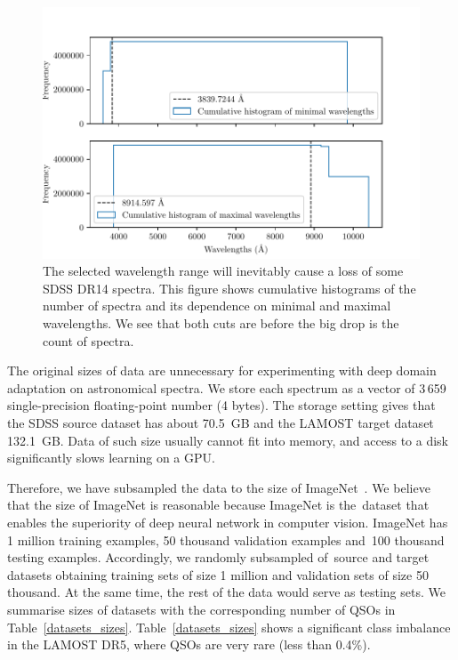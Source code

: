 \begin{figure}
\includegraphics[width=\textwidth]{img/waves_cumulative_hist.pdf}
\caption[Losts in SDSS DR14 spectra due to wavelength range]{
	The selected wavelength range will inevitably
	cause a loss of some SDSS DR14 spectra.
	This figure shows cumulative histograms of the number of spectra
	and its dependence on minimal and maximal wavelengths.
	We see that both cuts are before the big drop is the count of spectra.
	}
\label{waves_cumulative_hist}
\end{figure}

The original sizes of data are unnecessary for experimenting with deep domain adaptation on astronomical spectra.
We store each spectrum as a vector of 3\,659 single-precision floating-point number (4 bytes).
The storage setting gives that the SDSS source dataset has about 70.5~GB
and the LAMOST target dataset 132.1~GB.
Data of such size usually cannot fit into memory,
and access to a disk significantly slows learning on a GPU.

Therefore, we have subsampled the data to the size of ImageNet~\cite{russakovsky2015}.
We believe that the size of ImageNet is reasonable
because ImageNet is the~dataset that enables the superiority of deep neural network in computer vision.
ImageNet has 1 million training examples, 50 thousand validation examples
and~100 thousand testing examples.
Accordingly, we randomly subsampled of~source and target datasets
obtaining training sets of size 1 million
and validation sets of size 50 thousand.
At the same time, the rest of the data would serve as testing sets.
We summarise sizes of datasets with the corresponding number of QSOs in Table~\ref{datasets_sizes}.
Table~\ref{datasets_sizes} shows a significant class imbalance in the LAMOST DR5,
where QSOs are very rare (less than 0.4\%).

